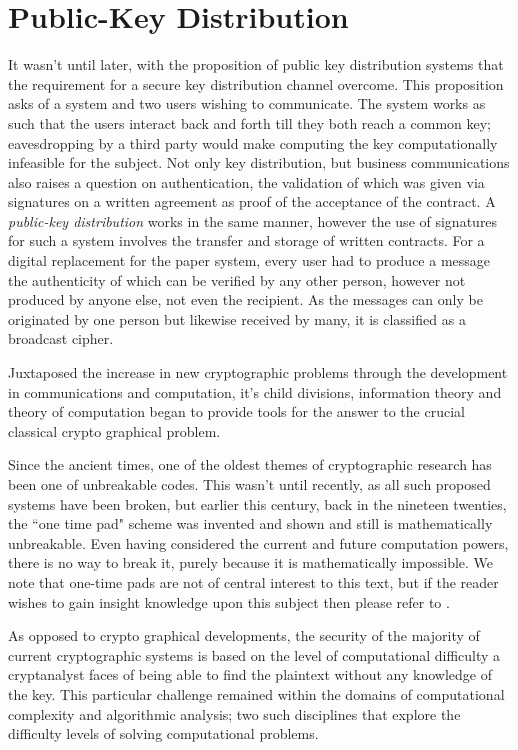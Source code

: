 \documentclass[iwp,first]{luthesis}
\begin{document}
\section{Public-Key Distribution}

It wasn't until later, with the proposition of public key distribution systems that the requirement for a secure key distribution channel overcome. This proposition asks of a system and two users wishing to communicate. The system works as such that the users interact back and forth till they both reach a common key; eavesdropping by a third party would make computing the key computationally infeasible for the subject. Not only key distribution, but business communications also raises a question on authentication, the validation of which was given via signatures on a written agreement as proof of the acceptance of the contract. A \textit{public-key distribution} works in the same manner, however the use of signatures for such a system involves the transfer and storage of written contracts. For a digital replacement for the paper system, every user had to produce a message the authenticity of which can be verified by any other person, however not produced by anyone else, not even the recipient. As the messages can only be originated by one person but likewise received by many, it is classified as a broadcast cipher. 

Juxtaposed the increase in new cryptographic problems through the development in communications and computation, it's child divisions, information theory and theory of computation began to provide tools for the answer to the crucial classical crypto graphical problem. 

Since the ancient times, one of the oldest themes of cryptographic research has been one of unbreakable codes. This wasn't until recently, as all such proposed systems have been broken, but earlier this century, back in the nineteen twenties, the ``one time pad" scheme was invented and shown and still is mathematically unbreakable. Even having considered the current and future computation powers, there is no way to break it, purely because it is mathematically impossible. We note that one-time pads are not of central interest to this text, but if the reader wishes to gain insight knowledge upon this subject then please refer to \cite{NDCrypt}.

As opposed to crypto graphical developments, the security of the majority of current cryptographic systems is based on the level of computational difficulty a cryptanalyst faces of being able to find the plaintext without any knowledge of the key. This particular challenge remained within the domains of computational complexity and algorithmic analysis; two such disciplines that explore the difficulty levels of solving computational problems.
\end{document}
